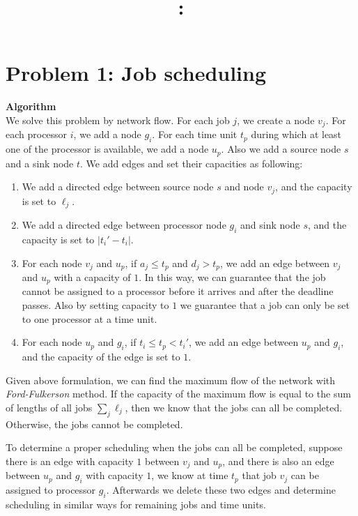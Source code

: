 \documentclass{article}
\title{\textmd{\bf \Class: \Title}}
\date{}
\author{\textbf{\StudentName}}
\newcommand{\Algorithm}{\textbf{Algorithm} \\}
\begin{document}
\maketitle \thispagestyle{empty}
\section*{Problem 1: Job scheduling}
\Algorithm
We solve this problem by network flow. For each job $j$, we create a node $v_j$. 
For each processor $i$, we add a node $g_i$.
For each time unit $t_p$ during which at least one of the processor is available, we add a node $u_p$. 
Also we add a source node $s$ and a sink node $t$. 
We add edges and set their capacities as following:
\begin{enumerate}
  \item We add a directed edge between source node $s$ and node $v_j$, and the capacity is set to
    $\ell_j$.
  \item We add a directed edge between processor node $g_i$ and sink node $s$, and the capacity is
    set to $|t_i' - t_i|$.

  \item For each node $v_j$ and $u_p$, if $a_j \leq t_p$ and $d_j > t_p$, we add an edge between $v_j$
    and $u_p$ with a capacity of $1$. In this way, we can guarantee that the job cannot be assigned
    to a processor before it arrives and after the deadline passes. Also by setting capacity to $1$
    we guarantee that a job can only be set to one processor at a time unit.  
  \item For each node $u_p$ and $g_i$, if $t_i \leq t_p < t_i'$, we add an edge between $u_p$ and
    $g_i$, and the capacity of the edge is set to $1$. 
\end{enumerate}

Given above formulation, we can find the maximum flow of the network with \textit{Ford-Fulkerson}
method. If the capacity of the maximum
flow is equal to the sum of lengths of all jobs $\sum_{j} \ell_j$, then we know that the jobs can
all be completed. Otherwise, the jobs cannot be completed. 

To determine a proper scheduling when the
jobs can all be completed, suppose there is an edge with capacity $1$ between $v_j$ and $u_p$, and
there is also an edge between $u_p$ and $g_i$ with capacity $1$,  
we know at time $t_p$ that job $v_j$ can be assigned to processor $g_i$. Afterwards we delete these
two edges and determine scheduling in similar ways for remaining jobs and time units.
\end{document}

